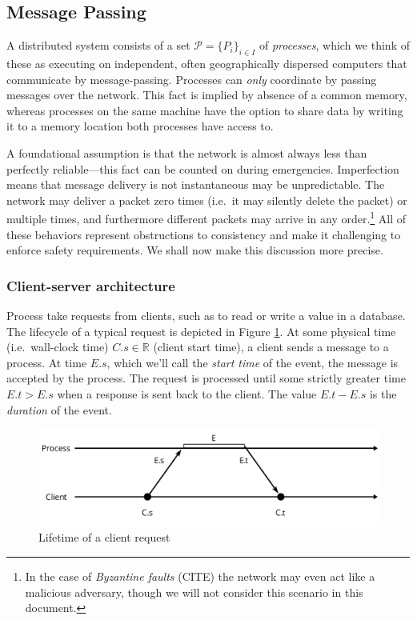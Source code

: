 \documentclass[]             %
{NASA}                       %
\theoremstyle{definition}
\begin{document}
\hypertarget{message-passing}{%
\subsection{Message Passing}\label{message-passing}}

A distributed system consists of a set
\(\mathcal{P} = \{P_i\}_{i\in I}\) of \emph{processes}, which we think
of these as executing on independent, often geographically dispersed
computers that communicate by message-passing. Processes can \emph{only}
coordinate by passing messages over the network. This fact is implied by
absence of a common memory, whereas processes on the same machine have
the option to share data by writing it to a memory location both
processes have access to.

A foundational assumption is that the network is almost always less than
perfectly reliable---this fact can be counted on during emergencies.
Imperfection means that message delivery is not instantaneous may be
unpredictable. The network may deliver a packet zero times (i.e.~it may
silently delete the packet) or multiple times, and furthermore different
packets may arrive in any order.\footnote{In the case of \emph{Byzantine
  faults} (CITE) the network may even act like a malicious adversary,
  though we will not consider this scenario in this document.} All of
these behaviors represent obstructions to consistency and make it
challenging to enforce safety requirements. We shall now make this
discussion more precise.

\hypertarget{client-server-architecture}{%
\subsubsection{Client-server
architecture}\label{client-server-architecture}}

Process take requests from clients, such as to read or write a value in
a database. The lifecycle of a typical request is depicted in Figure
\ref{fig:request}. At some physical time (i.e.~wall-clock time)
\(C.s \in \mathbb{R}\) (client start time), a client sends a message to
a process. At time \(E.s\), which we'll call the \emph{start time} of
the event, the message is accepted by the process. The request is
processed until some strictly greater time \(E.t > E.s\) when a response
is sent back to the client. The value \(E.t - E.s\) is the
\emph{duration} of the event.

\begin{figure}[h]
  \center
  \includegraphics[scale=0.4]{images/request.png}
  \caption{Lifetime of a client request}
  \label{fig:request}
\end{figure}
\end{document}
